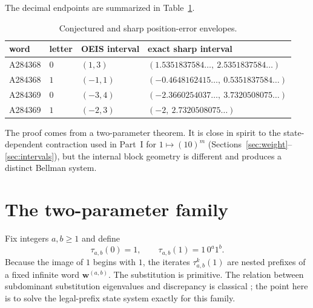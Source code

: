 \documentclass[11pt]{article}
\numberwithin{equation}{section}
\theoremstyle{definition}
\theoremstyle{remark}
\newcommand{\word}{\mathbf{w}}
\begin{document}
The decimal endpoints are summarized in Table~\ref{qmw:tab:bounds}.

\begin{table}[ht]
\centering
\caption{Conjectured and sharp position-error envelopes.}
\label{qmw:tab:bounds}
\begin{tabular}{@{}llll@{}}
\toprule
word & letter & OEIS interval & exact sharp interval \\
\midrule
A284368 & $0$ & $(1,3)$ & $(1.5351837584\ldots,\ 2.5351837584\ldots)$ \\
A284368 & $1$ & $(-1,1)$ & $(-0.4648162415\ldots,\ 0.5351837584\ldots)$ \\
A284369 & $0$ & $(-3,4)$ & $(-2.3660254037\ldots,\ 3.7320508075\ldots)$ \\
A284369 & $1$ & $(-2,3)$ & $(-2,\ 2.7320508075\ldots)$ \\
\bottomrule
\end{tabular}
\end{table}

The proof comes from a two-parameter theorem.  It is close in spirit to the
state-dependent contraction used in Part~I for
$1\mapsto(10)^m$ (Sections~\ref{sec:weight}--\ref{sec:intervals}), but the internal block geometry is different and produces
a distinct Bellman system.

\section{The two-parameter family}\label{qmw:sec:family}

Fix integers $a,b\geq1$ and define
\begin{equation}\label{qmw:eq:tauab}
\tau_{a,b}(0)=1,
\qquad
\tau_{a,b}(1)=1\,0^a1^b.
\end{equation}
Because the image of $1$ begins with $1$, the iterates
$\tau_{a,b}^k(1)$ are nested prefixes of a fixed infinite word
$\word^{(a,b)}$.  The substitution is primitive.  The relation between
subdominant substitution eigenvalues and discrepancy is classical
\cite{adam2003,adamczewski}; the point here is to solve the legal-prefix state
system exactly for this family.
\end{document}
